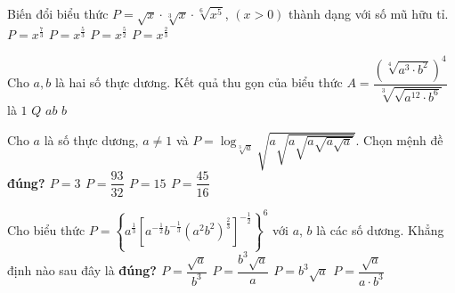 \begin{ex}%
	Biến đổi biểu thức $P=\sqrt{x} \cdot \sqrt[3]{x} \cdot \sqrt[6]{x^5}$, $(x>0)$ thành dạng với số mũ hữu tỉ. 
	\choice
	{$P=x^{\tfrac{7}{3}}$}
	{\True $P=x^{\tfrac{5}{3}}$}
	{$P=x^{\tfrac{5}{2}}$}
	{$P=x^{\tfrac{2}{3}}$}
\end{ex}
\begin{ex}%
	Cho $a,b$ là hai số thực dương. Kết quả thu gọn của biểu thức $A=\dfrac{(\sqrt[4]{a^3 \cdot b^2})^4}{\sqrt[3]{\sqrt{a^{12} \cdot b^6}}}$ là 
	\choice
	{$1$}
	{$Q$}
	{\True $ab$}
	{$b$}
\end{ex}
\begin{ex}%
	Cho $a$ là số thực dương, $a\neq 1$ và $P=\log_{\sqrt[3]{a}}\sqrt{a\sqrt{a\sqrt{a\sqrt{a\sqrt{a}}}}}$. Chọn mệnh đề \bf{đúng}?
	\choice
	{$P=3$}
	{\True $P=\dfrac{93}{32}$}
	{$P=15$}
	{$P=\dfrac{45}{16}$}
\end{ex}
\begin{ex}%
	Cho biểu thức $P=\left\{a^{\tfrac{1}{3}}\left[a^{-\tfrac{1}{2}}b^{-\tfrac{1}{3}}\left(a^2b^2\right)^{\tfrac{2}{3}}\right]^{-\tfrac{1}{2}}\right\}^6$ với $a$, $b$ là các số dương. Khẳng định nào sau đây là \bf{đúng}?
	\choice
	{$P=\dfrac{\sqrt{a}}{b^3}$}
	{$P=\dfrac{b^3\sqrt{a}}{a}$}
	{$P=b^3\sqrt{a}$}
	{\True $P=\dfrac{\sqrt{a}}{a \cdot b^3}$}
\end{ex}
